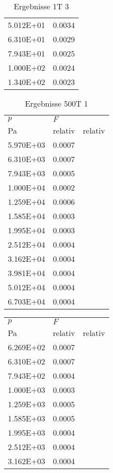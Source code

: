 \begin{table}
\begin{tabular}{l l }
\num{5.012E+01}&\num{0.0034}\\
\num{6.310E+01}&\num{0.0029}\\
\num{7.943E+01}&\num{0.0025}\\
\num{1.000E+02}&\num{0.0024}\\
\num{1.340E+02}&\num{0.0023}\\
\bottomrule
\end{tabular}\caption{Ergebnisse 1T 3}\end{table}\begin{table}\begin{tabular}{l l }
\toprule
$p$&$F$\\
 Pa & relativ & relativ\\\midrule
\num{5.970E+03}&\num{0.0007}\\
\num{6.310E+03}&\num{0.0007}\\
\num{7.943E+03}&\num{0.0005}\\
\num{1.000E+04}&\num{0.0002}\\
\num{1.259E+04}&\num{0.0006}\\
\num{1.585E+04}&\num{0.0003}\\
\num{1.995E+04}&\num{0.0003}\\
\num{2.512E+04}&\num{0.0004}\\
\num{3.162E+04}&\num{0.0004}\\
\num{3.981E+04}&\num{0.0004}\\
\num{5.012E+04}&\num{0.0004}\\
\num{6.703E+04}&\num{0.0004}\\
\bottomrule
\end{tabular}\caption{Ergebnisse 500T 1}\end{table}\begin{table}\begin{tabular}{l l }
\toprule
$p$&$F$\\
 Pa & relativ & relativ\\\midrule
\num{6.269E+02}&\num{0.0007}\\
\num{6.310E+02}&\num{0.0007}\\
\num{7.943E+02}&\num{0.0004}\\
\num{1.000E+03}&\num{0.0003}\\
\num{1.259E+03}&\num{0.0005}\\
\num{1.585E+03}&\num{0.0005}\\
\num{1.995E+03}&\num{0.0004}\\
\num{2.512E+03}&\num{0.0004}\\
\num{3.162E+03}&\num{0.0004}\\

\end{tabular}
\end{table}
